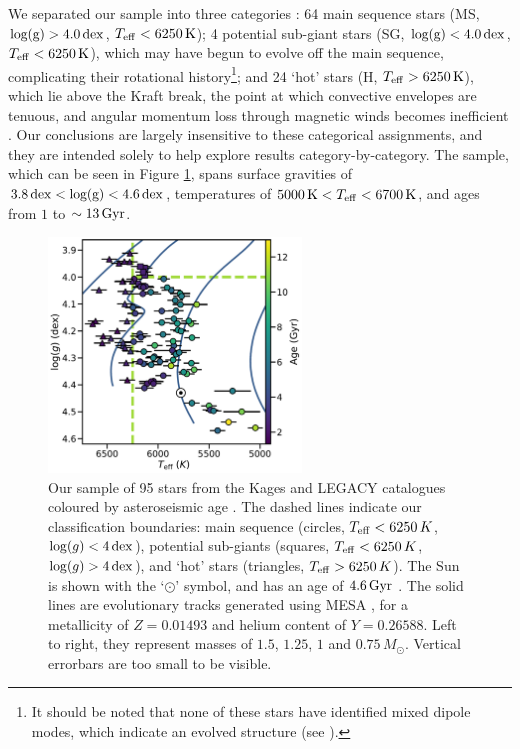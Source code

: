 \documentclass[12pt]{article}
\newcommand{\teff}{\mbox{$T_{\rm eff}$}\xspace}
\newcommand{\logg}{\mbox{$\log(g)$}\xspace}
\begin{document}
We separated our sample into three categories \cite{garcia+2014}: 64 main sequence stars (MS, $\rm{log(g)} > 4.0\, \rm dex$, $T_{\rm eff} < 6250\, \rm K$); 4 potential sub-giant stars (SG, $\rm{log(g)} < 4.0\, \rm dex$, $T_{\rm eff} < 6250\, \rm K$), which may have begun to evolve off the main sequence, complicating their rotational history\footnote{It should be noted that none of these stars have identified mixed dipole modes, which indicate an evolved structure (see \cite{bedding+2010}).}; and 24 `hot' stars (H, $T_{\rm eff} > 6250\, \rm K$), which lie above the Kraft break, the point at which convective envelopes are tenuous, and angular momentum loss through magnetic winds becomes inefficient \cite{kraft1967}. Our conclusions are largely insensitive to these categorical assignments, and they are intended solely to help explore results category-by-category. The sample, which can be seen in Figure \ref{fig:sample}, spans surface gravities of $3.8\, \rm{dex} < \rm{log(g)} < 4.6\, \rm{dex}$, temperatures of $5000\, \textrm{K} < T_{\rm eff} <  6700\, \rm{K}$, and ages from $1$ to $\sim 13\, \rm{Gyr}$.\\

\begin{figure}
	\centering
	\includegraphics[width=0.6\textwidth]{data.pdf}
	\caption{Our sample of 95 stars from the Kages and LEGACY catalogues coloured by asteroseismic age  \cite{silvaaguirre+2015, silvaaguirre+2017}. The dashed lines indicate our classification boundaries: main sequence (circles, $\teff < 6250\, K$, $\logg < 4\, \rm{dex}$), potential sub-giants (squares, $\teff < 6250\, K$, $\logg > 4\, \rm{dex}$), and `hot' stars (triangles, $\teff > 6250\, K$). The Sun is shown with the `$\odot$' symbol, and has an age of $4.6\, \rm{Gyr}$ \cite{bonanno+frohlich2015}. The solid lines are evolutionary tracks generated using MESA \cite{paxton+2017}, for a metallicity of $Z = 0.01493$ and helium content of $Y = 0.26588$. Left to right, they represent masses of $1.5$, $1.25$, $1$ and $0.75\, M_\odot$. Vertical errorbars are too small to be visible.}
	\label{fig:sample}
\end{figure}
\end{document}

